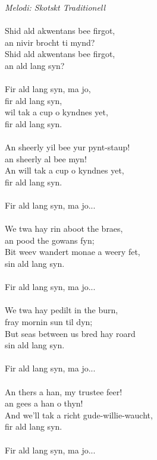 {\footnotesize\textit{Melodi: Skotskt Traditionell}}\\
\\
Shid ald akwentans bee firgot,\\
an nivir brocht ti mynd?\\
Shid ald akwentans bee firgot,\\
an ald lang syn?\\
\\
Fir ald lang syn, ma jo,\\
fir ald lang syn,\\
wil tak a cup o kyndnes yet,\\
fir ald lang syn.\\
\\
An sheerly yil bee yur pynt-staup!\\
an sheerly al bee myn!\\
An will tak a cup o kyndnes yet,\\
fir ald lang syn.\\
\\
Fir ald lang syn, ma jo...\\
\\
We twa hay rin aboot the braes,\\
an pood the gowans fyn;\\
Bit weev wandert monae a weery fet,\\
sin ald lang syn.\\
\\
Fir ald lang syn, ma jo...\\
\\
We twa hay pedilt in the burn,\\
fray mornin sun til dyn;\\
But seas between us bred hay roard\\
sin ald lang syn.\\
\\
Fir ald lang syn, ma jo...\\
\\
An thers a han, my trustee feer!\\
an gees a han o thyn!\\
And we’ll tak a richt gude-willie-waucht,\\
fir ald lang syn.\\
\\
Fir ald lang syn, ma jo...
